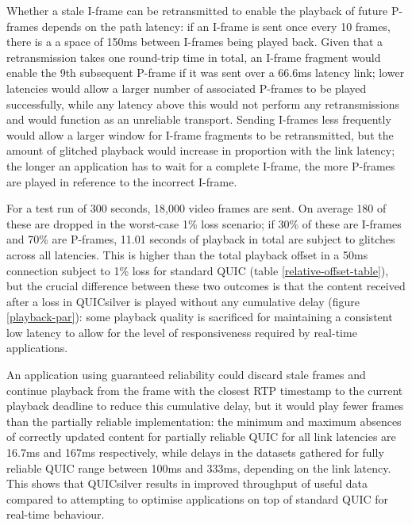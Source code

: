 \documentclass{mpaper}
\begin{document}
Whether a stale I-frame can be retransmitted to enable the playback of future P-frames depends on the path latency: if an I-frame is sent once every 10 frames, there is a a space of 150ms between I-frames being played back. Given that a retransmission takes one round-trip time in total, an I-frame fragment would enable the 9th subsequent P-frame if it was sent over a 66.6ms latency link; lower latencies would allow a larger number of associated P-frames to be played successfully, while any latency above this would not perform any retransmissions and would function as an unreliable transport. Sending I-frames less frequently would allow a larger window for I-frame fragments to be retransmitted, but the amount of glitched playback would increase in proportion with the link latency; the longer an application has to wait for a complete I-frame, the more P-frames are played in reference to the incorrect I-frame.


For a test run of 300 seconds, 18,000 video frames are sent. On average 180 of these are dropped in the worst-case 1\% loss scenario; if 30\% of these are I-frames and 70\% are P-frames, 11.01 seconds of playback in total are subject to glitches across all latencies. This is higher than the total playback offset in a 50ms connection subject to 1\% loss for standard QUIC (table \ref{relative-offset-table}), but the crucial difference between these two outcomes is that the content received after a loss in QUICsilver is played without any cumulative delay (figure \ref{playback-par}): some playback quality is sacrificed for maintaining a consistent low latency to allow for the level of responsiveness required by real-time applications.


An application using guaranteed reliability could discard stale frames and continue playback from the frame with the closest RTP timestamp to the current playback deadline to reduce this cumulative delay, but it would play fewer frames than the partially reliable implementation: the minimum and maximum absences of correctly updated content for partially reliable QUIC for all link latencies are 16.7ms and 167ms respectively, while delays in the datasets gathered for fully reliable QUIC range between 100ms and 333ms, depending on the link latency. This shows that QUICsilver results in improved throughput of useful data compared to attempting to optimise applications on top of standard QUIC for real-time behaviour.

\end{document}
